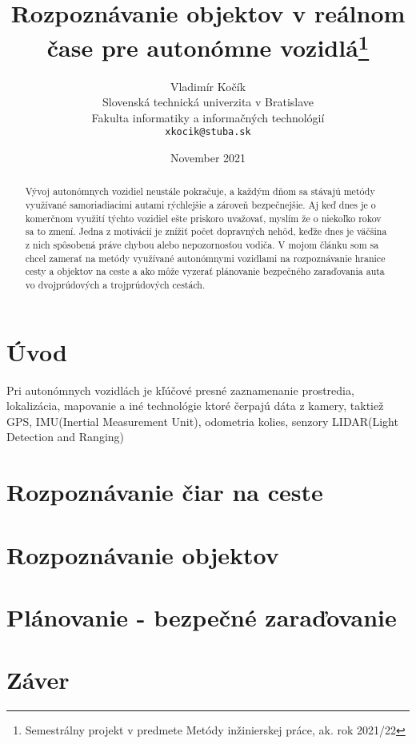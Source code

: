 \documentclass[10pt,twoside,slovak,a4paper]{article}
\title{Rozpoznávanie objektov v reálnom čase pre autonómne vozidlá\thanks{Semestrálny projekt v predmete Metódy inžinierskej práce, ak. rok 2021/22}}
\author{Vladimír Kočík\\[2pt]
	{\small Slovenská technická univerzita v Bratislave}\\
	{\small Fakulta informatiky a informačných technológií}\\
	{\small \texttt{xkocik@stuba.sk}}
	}
\date{November 2021}
\begin{document}
\maketitle
\begin{abstract}

Vývoj autonómnych vozidiel neustále pokračuje, a každým dňom sa stávajú metódy využívané samoriadiacimi autami rýchlejšie a zároveň bezpečnejšie. Aj keď dnes je o komerčnom využití týchto vozidiel ešte priskoro uvažovať, myslím že o niekoľko rokov sa to zmení. Jedna z motivácií je znížiť počet dopravných nehôd, keďže dnes je väčšina z nich spôsobená práve chybou alebo nepozornosťou vodiča. V mojom článku som sa chcel zamerať na metódy využívané autonómnymi vozidlami na rozpoznávanie hranice cesty a objektov na ceste a ako môže vyzerať plánovanie bezpečného zaraďovania auta vo dvojprúdových a trojprúdových cestách.


\end{abstract}

\section{Úvod} 
Pri autonómnych vozidlách je kľúčové presné zaznamenanie prostredia, lokalizácia, mapovanie a iné technológie ktoré čerpajú dáta z kamery, taktiež GPS, IMU(Inertial Measurement Unit), odometria kolies, senzory LIDAR(Light Detection and Ranging) 


\cite{6629552}

\section{Rozpoznávanie čiar na ceste}
\cite {KSII}
\cite {9179748}
\cite{tiis:22283}
\cite{tiis:23914}


\section{Rozpoznávanie objektov}


\cite {9337402}
\cite {9253253}

\section{Plánovanie - bezpečné zaraďovanie}


\cite {9034121}

\section{Záver}



\end{document}

